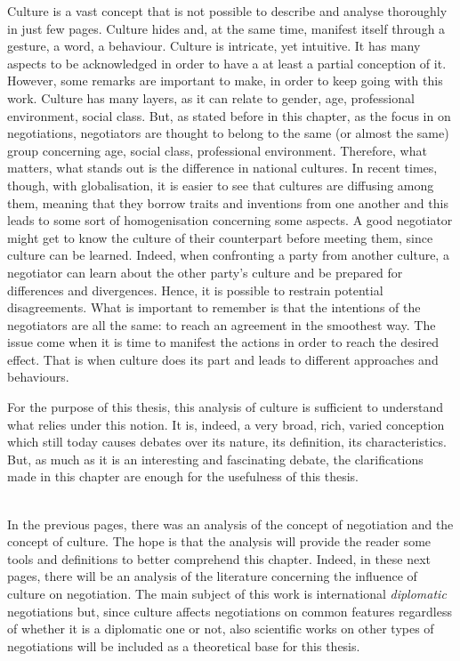 \documentclass[../main.tex]{subfiles}
\begin{document}
Culture is a vast concept that is not possible to describe and analyse thoroughly in just few pages. Culture hides and, at the same time, manifest itself through a gesture, a word, a behaviour. Culture is intricate, yet intuitive. It has many aspects to be acknowledged in order to have a at least a partial conception of it. However, some remarks are important to make, in order to keep going with this work. Culture has many layers, as it can relate to gender, age, professional environment, social class. But, as stated before in this chapter, as the focus in on negotiations, negotiators are thought to belong to the same (or almost the same) group concerning age, social class, professional environment. Therefore, what matters, what stands out is the difference in national cultures. In recent times, though, with globalisation, it is easier to see that cultures are diffusing among them, meaning that they borrow traits and inventions from one another and this leads to some sort of homogenisation concerning some aspects.
A good negotiator might get to know the culture of their counterpart before meeting them, since culture can be learned. Indeed, when confronting a party from another culture, a negotiator can learn about the other party's culture and be prepared for differences and divergences. Hence, it is possible to restrain potential disagreements. What is important to remember is that the intentions of the negotiators are all the same: to reach an agreement in the smoothest way. The issue come when it is time to manifest the actions in order to reach the desired effect. That is when culture does its part and leads to different approaches and behaviours.

For the purpose of this thesis, this analysis of culture is sufficient to understand what relies under this notion. It is, indeed, a very broad, rich, varied conception which still today causes debates over its nature, its definition, its characteristics. But, as much as it is an interesting and fascinating debate, the clarifications made in this chapter are enough for the usefulness of this thesis.
\pagebreak

\\

In the previous pages, there was an analysis of the concept of negotiation and the concept of culture. The hope is that the analysis will provide the reader some tools and definitions to better comprehend this chapter. Indeed, in these next pages, there will be an analysis of the literature concerning the influence of culture on negotiation. The main subject of this work is international \textit{diplomatic} negotiations but, since culture affects negotiations on common features regardless of whether it is a diplomatic one or not, also scientific works on other types of negotiations will be included as a theoretical base for this thesis.%
\end{document}
